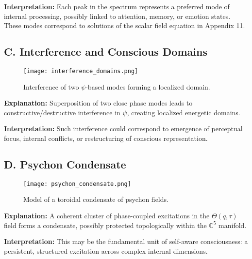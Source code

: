 \textbf{Interpretation:} Each peak in the spectrum represents a preferred mode of internal processing, possibly linked to attention, memory, or emotion states. These modes correspond to solutions of the scalar field equation in Appendix 11.

\subsection*{C. Interference and Conscious Domains}

\begin{figure}[H]
\centering
\texttt{[image: interference\_domains.png]}
\caption{Interference of two \(\psi\)-based modes forming a localized domain.}
\end{figure}

\textbf{Explanation:} Superposition of two close phase modes leads to constructive/destructive interference in \(\psi\), creating localized energetic domains.

\textbf{Interpretation:} Such interference could correspond to emergence of perceptual focus, internal conflicts, or restructuring of conscious representation.

\subsection*{D. Psychon Condensate}

\begin{figure}[H]
\centering
\texttt{[image: psychon\_condensate.png]}
\caption{Model of a toroidal condensate of psychon fields.}
\end{figure}

\textbf{Explanation:} A coherent cluster of phase-coupled excitations in the \(\Theta(q, \tau)\) field forms a condensate, possibly protected topologically within the \(\mathbb{C}^5\) manifold.

\textbf{Interpretation:} This may be the fundamental unit of self-aware consciousness: a persistent, structured excitation across complex internal dimensions.

